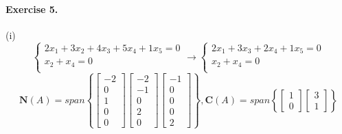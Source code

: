 \documentclass{article}
\begin{document}
  \paragraph{Exercise 5.}
  (i)\[
    \left\{
    \begin{array}{c}
    2x_1+3x_2+4x_3+5x_4+1x_5=0\\
    x_2+x_4=0\\
    \end{array}\right.
    \rightarrow
    \left\{
    \begin{array}{c}
    2x_1+3x_3+2x_4+1x_5=0\\
    x_2+x_4=0\\
    \end{array}\right.
  \]
  \[
  \mathbf{N}(A)=span
  \left\{
    \begin{bmatrix}
    -2\\0\\1\\0\\0
    \end{bmatrix}
    \begin{bmatrix}
      -2\\-1\\0\\2\\0
      \end{bmatrix}   
      \begin{bmatrix}
        -1\\0\\0\\0\\2
        \end{bmatrix} 
    \right\},
    \mathbf{C}(A)=span
    \left\{
      \begin{bmatrix}
      1\\0
      \end{bmatrix}
      \begin{bmatrix}
      3\\1
        \end{bmatrix}   
      \right\}
  \]
\end{document}
